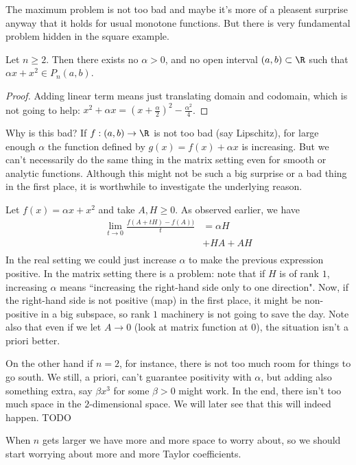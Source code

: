 The maximum problem is not too bad and maybe it's more of a pleasent surprise anyway that it holds for usual monotone functions. But there is very fundamental problem hidden in the square example.

\begin{prop}
	Let $n \geq 2$. Then there exists no $\alpha > 0$, and no open interval $(a, b) \subset \R$ such that $\alpha x + x^{2} \in P_{n}(a, b)$.
\end{prop}
\begin{proof}
	Adding linear term means just translating domain and codomain, which is not going to help: $x^2 + \alpha x = (x + \frac{\alpha}{2})^2 - \frac{\alpha^2}{4}$.
\end{proof}

Why is this bad? If $f : (a, b) \to \R$ is not too bad (say Lipschitz), for large enough $\alpha$ the function defined by $g(x) = f(x) + \alpha x$ is increasing. But we can't necessarily do the same thing in the matrix setting even for smooth or analytic functions. Although this might not be such a big surprise or a bad thing in the first place, it is worthwhile to investigate the underlying reason.

Let $f(x) = \alpha x + x^2$ and take $A, H \geq 0$. As observed earlier, we have
\begin{align*}
	\lim_{t \to 0} \frac{f(A + t H) - f(A))}{t} &= \alpha H \\
	&+ H A + A H\\
\end{align*}
In the real setting we could just increase $\alpha$ to make the previous expression positive. In the matrix setting there is a problem: note that if $H$ is of rank $1$, increasing $\alpha$ means ``increasing the right-hand side only to one direction". Now, if the right-hand side is not positive (map) in the first place, it might be non-positive in a big subspace, so rank $1$ machinery is not going to save the day. Note also that even if we let $A \to 0$ (look at matrix function at $0$), the situation isn't a priori better.

On the other hand if $n = 2$, for instance, there is not too much room for things to go south. We still, a priori, can't guarantee positivity with $\alpha$, but adding also something extra, say $\beta x^3$ for some $\beta > 0$ might work. In the end, there isn't too much space in the $2$-dimensional space. We will later see that this will indeed happen. TODO

When $n$ gets larger we have more and more space to worry about, so we should start worrying about more and more Taylor coefficients.

